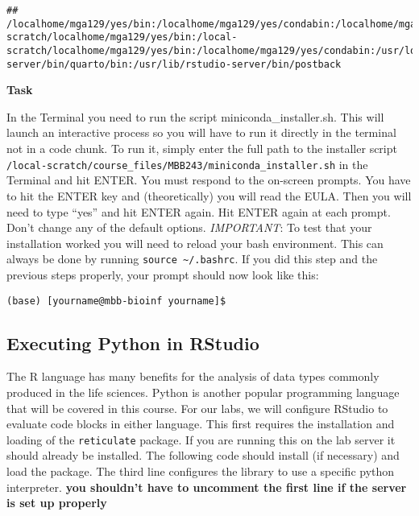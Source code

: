 \documentclass[
]{article}
\newenvironment{Shaded}{\begin{snugshade}}{\end{snugshade}}
\newcommand{\BuiltInTok}[1]{#1}
\newcommand{\VariableTok}[1]{\textcolor[rgb]{0.00,0.00,0.00}{#1}}
\begin{document}
\begin{Shaded}
\end{Shaded}

\begin{verbatim}
## /localhome/mga129/yes/bin:/localhome/mga129/yes/condabin:/localhome/mga129/.local/bin:/localhome/mga129/bin:/local-scratch/localhome/mga129/yes/bin:/local-scratch/localhome/mga129/yes/bin:/localhome/mga129/yes/condabin:/usr/local/sbin:/usr/local/bin:/usr/sbin:/usr/bin:/usr/lib/rstudio-server/bin/quarto/bin:/usr/lib/rstudio-server/bin/postback
\end{verbatim}

\textbf{Task}

In the Terminal you need to run the script miniconda\_installer.sh. This
will launch an interactive process so you will have to run it directly
in the terminal not in a code chunk. To run it, simply enter the full
path to the installer script
\texttt{/local-scratch/course\_files/MBB243/miniconda\_installer.sh} in
the Terminal and hit ENTER. You must respond to the on-screen prompts.
You have to hit the ENTER key and (theoretically) you will read the
EULA. Then you will need to type ``yes'' and hit ENTER again. Hit ENTER
again at each prompt. Don't change any of the default options.
\emph{IMPORTANT}: To test that your installation worked you will need to
reload your bash environment. This can always be done by running
\texttt{source\ \textasciitilde{}/.bashrc}. If you did this step and the
previous steps properly, your prompt should now look like this:

\texttt{(base)\ {[}yourname@mbb-bioinf\ yourname{]}\$}

\hypertarget{executing-python-in-rstudio}{%
\subsection{Executing Python in
RStudio}\label{executing-python-in-rstudio}}

The R language has many benefits for the analysis of data types commonly
produced in the life sciences. Python is another popular programming
language that will be covered in this course. For our labs, we will
configure RStudio to evaluate code blocks in either language. This first
requires the installation and loading of the \texttt{reticulate}
package. If you are running this on the lab server it should already be
installed. The following code should install (if necessary) and load the
package. The third line configures the library to use a specific python
interpreter. \textbf{you shouldn't have to uncomment the first line if
the server is set up properly}
\end{document}
